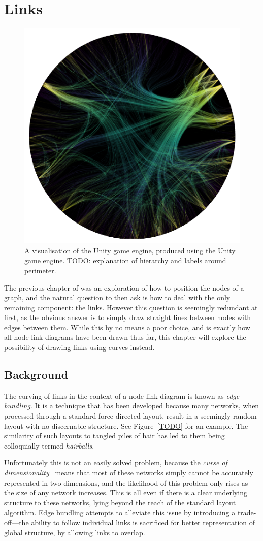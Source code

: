\chapter{Links}
\begin{figure}
    \centering
    \includegraphics[width=.6\textwidth]{power/figures/metaunityplaceholder.png}
    \caption{A visualisation of the Unity game engine, produced using the Unity game engine. TODO: explanation of hierarchy and labels around perimeter.}
    \label{fig:metaunity}
\end{figure}
The previous chapter of was an exploration of how to position the nodes of a graph, and the natural question to then ask is how to deal with the only remaining component: the links. However this question is seemingly redundant at first, as the obvious answer is to simply draw straight lines between nodes with edges between them. While this by no means a poor choice, and is exactly how all node-link diagrams have been drawn thus far, this chapter will explore the possibility of drawing links using curves instead.

\section{Background}
The curving of links in the context of a node-link diagram is known as \textit{edge bundling}. It is a technique that has been developed because many networks, when processed through a standard force-directed layout, result in a seemingly random layout with no discernable structure. See Figure~\ref{TODO} for an example. The similarity of such layouts to tangled piles of hair has led to them being colloquially termed \textit{hairballs}.

Unfortunately this is not an easily solved problem, because the \textit{curse of dimensionality}~\cite{Friedman2001} means that most of these networks simply cannot be accurately represented in two dimensions, and the likelihood of this problem only rises as the size of any network increases. This is all even if there is a clear underlying structure to these networks, lying beyond the reach of the standard layout algorithm.
Edge bundling attempts to alleviate this issue by introducing a trade-off---the ability to follow individual links is sacrificed for better representation of global structure, by allowing links to overlap.

